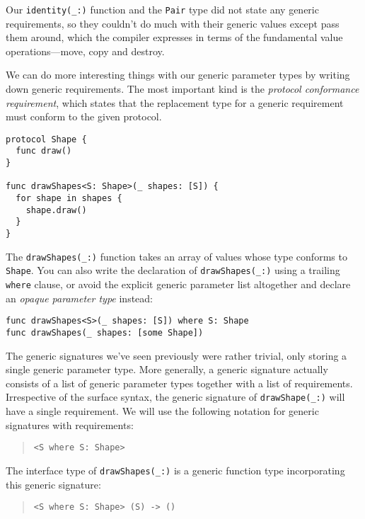 \documentclass[a4paper,headsepline,bibliography=totoc,toc=flat,fleqn,twoside=semi]{scrbook}
\theoremstyle{definition}
\theoremstyle{definition}
\theoremstyle{definition}
\begin{document}
Our \verb|identity(_:)| function and the \texttt{Pair} type did not state any generic requirements, so they couldn't do much with their generic values except pass them around, which the compiler expresses in terms of the fundamental value operations---move, copy and destroy.

We can do more interesting things with our generic parameter types by writing down generic requirements. The most important kind is the \emph{protocol conformance requirement}, which states that the replacement type for a generic requirement must conform to the given protocol.
\begin{Verbatim}
protocol Shape {
  func draw()
}

func drawShapes<S: Shape>(_ shapes: [S]) {
  for shape in shapes {
    shape.draw()
  }
}
\end{Verbatim}
The \verb|drawShapes(_:)| function takes an array of values whose type conforms to \texttt{Shape}. You can also write the declaration of \verb|drawShapes(_:)| using a trailing \texttt{where} clause, or avoid the explicit generic parameter list altogether and declare an \emph{opaque parameter type} instead:
\begin{Verbatim}
func drawShapes<S>(_ shapes: [S]) where S: Shape
func drawShapes(_ shapes: [some Shape])
\end{Verbatim}

The generic signatures we've seen previously were rather trivial, only storing a single generic parameter type. More generally, a generic signature actually consists of a list of generic parameter types together with a list of requirements. Irrespective of the surface syntax, the generic signature of \verb|drawShape(_:)| will have a single requirement. We will use the following notation for generic signatures with requirements:
\begin{quote}
\begin{verbatim}
<S where S: Shape>
\end{verbatim}
\end{quote}
The interface type of \verb|drawShapes(_:)| is a generic function type incorporating this generic signature:
\begin{quote}
\begin{verbatim}
<S where S: Shape> (S) -> ()
\end{verbatim}
\end{quote}
\end{document}
